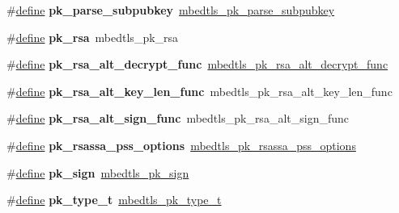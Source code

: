 \begin{DoxyCompactItemize}
\#\hyperlink{structdefine}{define} {\bfseries pk\+\_\+parse\+\_\+subpubkey}~\hyperlink{pk_8h_a261a06b48443981316e19bd1c2c377f9}{mbedtls\+\_\+pk\+\_\+parse\+\_\+subpubkey}
\item 
\mbox{\label{compat-1_83_8h_a4486eb0a23258bbdd5271c97cfd0872c}} 
\#\hyperlink{structdefine}{define} {\bfseries pk\+\_\+rsa}~mbedtls\+\_\+pk\+\_\+rsa
\item 
\mbox{\label{compat-1_83_8h_aa0810e66b8b0ad25fb61555a4cd1511f}} 
\#\hyperlink{structdefine}{define} {\bfseries pk\+\_\+rsa\+\_\+alt\+\_\+decrypt\+\_\+func}~\hyperlink{pk_8h_a01453ce20b7a8d47aaecd90ef9997e24}{mbedtls\+\_\+pk\+\_\+rsa\+\_\+alt\+\_\+decrypt\+\_\+func}
\item 
\mbox{\label{compat-1_83_8h_a9a71eba62cea84cc73dde52c1bde3a90}} 
\#\hyperlink{structdefine}{define} {\bfseries pk\+\_\+rsa\+\_\+alt\+\_\+key\+\_\+len\+\_\+func}~mbedtls\+\_\+pk\+\_\+rsa\+\_\+alt\+\_\+key\+\_\+len\+\_\+func
\item 
\mbox{\label{compat-1_83_8h_ad471f895a5d812225c8d4cad0f11d847}} 
\#\hyperlink{structdefine}{define} {\bfseries pk\+\_\+rsa\+\_\+alt\+\_\+sign\+\_\+func}~mbedtls\+\_\+pk\+\_\+rsa\+\_\+alt\+\_\+sign\+\_\+func
\item 
\mbox{\label{compat-1_83_8h_af4be01264f4ed1d6262f87fa44a5c256}} 
\#\hyperlink{structdefine}{define} {\bfseries pk\+\_\+rsassa\+\_\+pss\+\_\+options}~\hyperlink{structmbedtls__pk__rsassa__pss__options}{mbedtls\+\_\+pk\+\_\+rsassa\+\_\+pss\+\_\+options}
\item 
\mbox{\label{compat-1_83_8h_a47eaa47d311ef200c90a03b920f7b1cd}} 
\#\hyperlink{structdefine}{define} {\bfseries pk\+\_\+sign}~\hyperlink{pk_8h_a6055db23bfff422e65b3a41400344d15}{mbedtls\+\_\+pk\+\_\+sign}
\item 
\mbox{\label{compat-1_83_8h_ad7ae196adc1f1af4fa92668f0a2d721e}} 
\#\hyperlink{structdefine}{define} {\bfseries pk\+\_\+type\+\_\+t}~\hyperlink{pk_8h_a3fe41eff5605ae727eb9d28dad297020}{mbedtls\+\_\+pk\+\_\+type\+\_\+t}
\item 
\mbox{\label{compat-1_83_8h_a2ef728cb3127a9bf8e3248fe680f5a74}} 

\end{DoxyCompactItemize}

